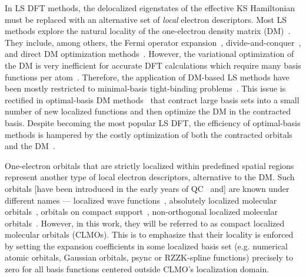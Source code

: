 \documentclass[aps,prl,twocolumn,reprint,amsmath,amssymb]{revtex4-1}
\begin{document}
In LS DFT methods, the delocalized eigenstates of the effective KS Hamiltonian must be replaced with an alternative set of \emph{local} electron descriptors. 
Most LS methods explore the natural locality of the one-electron density matrix (DM)~\cite{li1993density, lee1996linear, li2003density, shao2003curvy, vandevondele2012linear, kussmann2013linear, aarons2016perspective}.  
They include, among others, the Fermi operator expansion~\cite{goedecker1994efficient, goedecker1995tight}, divide-and-conquer~\cite{yang1991direct, yang1991local}, and direct DM optimization methods~\cite{li1993density, shao2003curvy, vandevondele2012linear}. 
However, the variational optimization of the DM is very inefficient for accurate DFT calculations which require many basis functions per atom~\cite{goedecker1999linear,vandevondele2012linear, arita2014stable, bowler2012methods, khaliullin2013efficient}.
Therefore, the application of DM-based LS methods have been mostly restricted to minimal-basis tight-binding problems~\cite{Richters2014, goringe1997tight, ratcliff2018band}. 
This issue is rectified in optimal-basis DM methods~\cite{skylaris2005introducing, nakata2015optimized, mohr2015accurate} that contract large basis sets into a small number of new localized functions and then optimize the DM in the contracted basis. 
Despite becoming the most popular LS DFT, the efficiency of optimal-basis methods is hampered by the costly optimization of both the contracted orbitals and the DM~\cite{mostofi2003preconditioned}.

One-electron orbitals that are strictly localized within predefined spatial regions represent another type of local electron descriptors, alternative to the DM. 
Such orbitals [have been introduced in the early years of QC~\cite{ZZZ} and] are known under different names --- localized wave functions~\cite{ordejon1995linear}, absolutely localized molecular orbitals~\cite{stoll1980use}, orbitals on compact support~\cite{RZZK}, non-orthogonal localized molecular orbitals~\cite{weitao}. 
However, in this work, they will be referred to as compact localized molecular orbitals (CLMOs). This is to emphasize that their locality is enforced by setting the expansion coefficients in some localized basis set (e.g. numerical atomic orbitals, Gaussian orbitals, psync or RZZK-spline functions) precisely to zero for all basis functions centered outside CLMO's localization domain.
\end{document}
